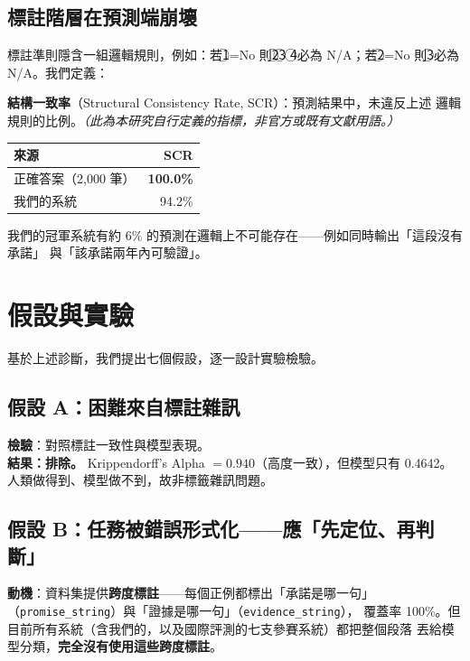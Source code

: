 \documentclass[11pt,a4paper]{ctexart}
\newcommand{\fieldname}[1]{\texttt{#1}}
\begin{document}
\subsection{標註階層在預測端崩壞}
\label{sec:scr}

標註準則隱含一組邏輯規則，例如：若\textcircled{1}=No 則\textcircled{2}\textcircled{3}
\textcircled{4}必為 N/A；若\textcircled{2}=No 則\textcircled{3}必為 N/A。我們定義：

\begin{tcolorbox}[colback=gray!8, colframe=gray!50]
\textbf{結構一致率}（Structural Consistency Rate, SCR）：預測結果中，未違反上述
邏輯規則的比例。\textit{（此為本研究自行定義的指標，非官方或既有文獻用語。）}
\end{tcolorbox}

\begin{table}[h]
\centering
\small
\begin{tabular}{@{}lr@{}}
\toprule
來源 & SCR \\
\midrule
正確答案（2{,}000 筆） & \textbf{100.0\%} \\
我們的系統             & 94.2\% \\
\bottomrule
\end{tabular}
\end{table}

我們的冠軍系統有約 6\% 的預測在邏輯上不可能存在——例如同時輸出「這段沒有承諾」
與「該承諾兩年內可驗證」。

\section{假設與實驗}

基於上述診斷，我們提出七個假設，逐一設計實驗檢驗。

\subsection*{假設 A：困難來自標註雜訊}
\textbf{檢驗}：對照標註一致性與模型表現。\\
\textbf{結果：排除。} Krippendorff's Alpha $=0.940$（高度一致），但模型只有 0.4642。
人類做得到、模型做不到，故非標籤雜訊問題。

\subsection*{假設 B：任務被錯誤形式化——應「先定位、再判斷」}

\textbf{動機}：資料集提供\textbf{跨度標註}——每個正例都標出「承諾是哪一句」
（\fieldname{promise\_string}）與「證據是哪一句」（\fieldname{evidence\_string}），
覆蓋率 100\%。但目前所有系統（含我們的，以及國際評測的七支參賽系統）都把整個段落
丟給模型分類，\textbf{完全沒有使用這些跨度標註}。
\end{document}
